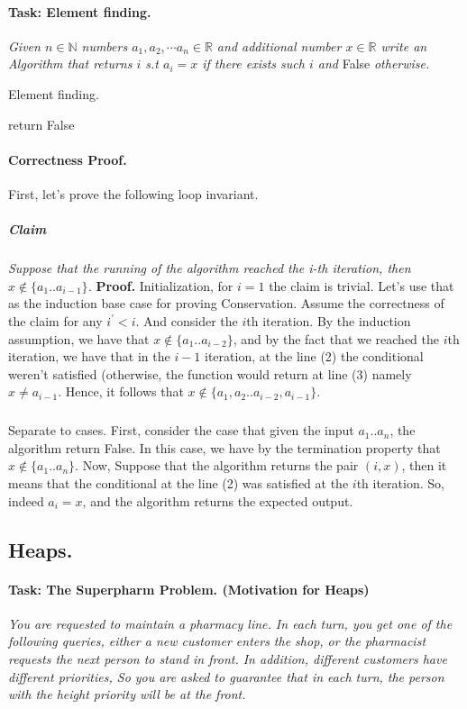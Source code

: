 \paragraph{Task: Element finding.}  \textit{Given $n\in \mathbb{N}$ numbers $a_1, a_2, \cdots a_n \in \mathbb{R}$ and additional number $x \in \mathbb{R}$ write an Algorithm that returns $i$ s.t $a_{i} = x$ if there exists such $i$ and} False \textit{otherwise.} 

\begin{algbox}{Element finding.}
\begin{algorithm}[H]
  { 
    } 
    return False 
\end{algorithm}
\end{algbox}
\paragraph{Correctness Proof.} First, let's prove the following loop invariant. 
\subparagraph{Claim} \textit{Suppose that the running of the algorithm reached the i-th iteration, then $x \notin \{ a_{1} .. a_{i-1} \}$.} 
\textbf{Proof.} Initialization, for $i=1$ the claim is trivial. Let's use that as the induction base case for proving Conservation. Assume the correctness of the claim for any $i^{\prime} < i$. And consider the $i$th iteration. By the induction assumption, we have that $x \notin \{a_1 .. a_{i-2} \} $, and by the fact that we reached the $i$th iteration, we have that in the $i-1$ iteration, at the line (2) the conditional weren't satisfied (otherwise, the function would return at line (3) namely $x \neq a_{i-1}$. Hence, it follows that $ x \notin \{ a_1, a_2 .. a_{i-2}, a_{i-1} \} $.     
  \subparagraph{} Separate to cases. First, consider the case that given the input $a_1 .. a_n$, the algorithm return False. In this case, we have by the termination property that $x \notin \{ a_1 .. a_n \} $. Now, Suppose that the algorithm returns the pair $\left( i, x \right)$, then it means that the conditional at the line (2) was satisfied at the $i$th iteration. So, indeed $a_{i} = x$, and the algorithm returns the expected output.        


  \newpage
\subsection*{Heaps.}
  \paragraph{Task: The Superpharm Problem. (Motivation for Heaps) }\textit{You are requested to maintain a pharmacy line. In each turn, you get one of the following queries, either a new customer enters the shop, or the pharmacist requests the next person to stand in front. In addition, different customers have different priorities, So you are asked to guarantee that in each turn, the person with the height priority will be at the front.}

